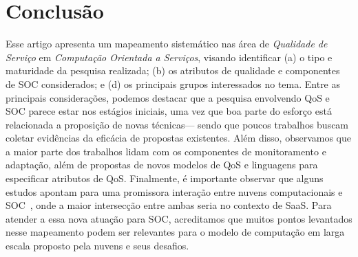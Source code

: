\section{Conclus\~{a}o}\label{sec:conclusao}

Esse artigo apresenta um mapeamento sistem\'{a}tico nas \'{a}rea 
de \emph{Qualidade de Servi\c co} em \emph{Computa\c c\~{a}o Orientada a Servi\c cos}, visando identificar 
(a) o tipo e maturidade da pesquisa realizada; (b) os atributos de qualidade e componentes de SOC considerados; 
e (d) os principais grupos interessados no tema. Entre as principais considera\c c\~{o}es, podemos destacar que 
a pesquisa envolvendo QoS e SOC parece estar nos est\'{a}gios iniciais, uma vez que boa parte do esfor\c co est\'{a} 
relacionada a proposi\c c\~{a}o de novas t\'{e}cnicas--- sendo que poucos trabalhos buscam coletar evid\^{e}ncias 
da efic\'{a}cia de propostas existentes.  Al\'{e}m disso, observamos que a maior parte dos trabalhos lidam com 
os componentes de monitoramento e adapta\c c\~{a}o, al\'{e}m de propostas de novos modelos de QoS e linguagens para 
especificar atributos de QoS. 
Finalmente, \'{e} importante observar que alguns estudos apontam para uma promissora intera\c{c}\~{a}o entre nuvens computacionais e SOC~\cite{10.1109/MIC.2010.147}, onde a maior intersec\c{c}\~{a}o entre ambas seria no contexto de SaaS. Para atender a essa nova atua\c{c}\~{a}o para SOC, acreditamos que muitos pontos levantados nesse mapeamento podem ser relevantes para o modelo de computa\c{c}\~{a}o em larga escala proposto pela nuvens e seus desafios.